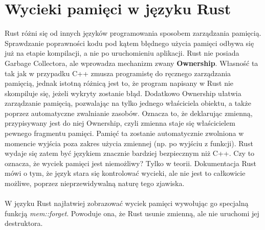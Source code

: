 \documentclass[12pt]{article}
\begin{document}
\section{Wycieki pamięci w języku Rust}
Rust różni się od innych języków programowania sposobem zarządzania pamięcią. Sprawdzanie poprawności kodu pod kątem błędnego użycia pamięci odbywa się już na etapie kompilacji, a nie po uruchomieniu aplikacji. Rust nie posiada Garbage Collectora, ale wprowadza mechanizm zwany \textbf{Ownership}. Własność ta tak jak w przypadku C++ zmusza programistę do ręcznego zarządzania pamięcią, jednak istotną różnicą jest to, że program napisany w Rust nie skompiluje się, jeżeli wykryty zostanie błąd. Dodatkowo Ownership ułatwia zarządzanie pamięcią, pozwalając na tylko jednego właściciela obiektu, a także poprzez automatyczne zwalnianie zasobów. Oznacza to, że deklarując zmienną, przypisywany jest do niej Ownership, czyli zmienna staje się właścicielem pewnego fragmentu pamięci. Pamięć ta zostanie automatycznie zwolniona w momencie wyjścia poza zakres użycia zmiennej (np. po wyjściu z funkcji). Rust wydaje się zatem być językiem znacznie bardziej bezpiecznym niż C++. Czy to oznacza, że wyciek pamięci jest niemożliwy? Tylko w teorii. Dokumentacja Rust mówi o tym, że język stara się kontrolować wycieki, ale nie jest to całkowicie możliwe, poprzez nieprzewidywalną naturę tego zjawiska. \\\\
W języku Rust najłatwiej zobrazować wyciek pamięci wywołując go specjalną funkcją \textit{mem::forget}. Powoduje ona, że Rust usunie zmienną, ale nie uruchomi jej destruktora.
\end{document}
